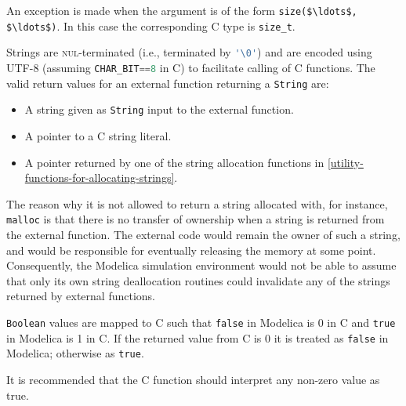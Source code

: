 An exception is made when the argument is of the form {\lstinline!size($\ldots$, $\ldots$)!}.
In this case the corresponding C type is {\lstinline!size_t!}.

Strings are \textsc{nul}-terminated (i.e., terminated by {\lstinline[language=C]!'\0'!}) and are encoded using UTF-8 (assuming {\lstinline[language=C]!CHAR_BIT==8!} in C) to facilitate calling of C functions.
The valid return values for an external function returning a {\lstinline!String!} are:
\begin{itemize}
\item A string given as {\lstinline!String!} input to the external function.
\item A pointer to a C string literal.
\item A pointer returned by one of the string allocation functions in \cref{utility-functions-for-allocating-strings}.
\end{itemize}

\begin{nonnormative}
The reason why it is not allowed to return a string allocated with, for instance, {\lstinline[language=C]!malloc!} is that there is no transfer of ownership when a string is returned from the external function.
The external code would remain the owner of such a string, and would be responsible for eventually releasing the memory at some point.
Consequently, the Modelica simulation environment would not be able to assume that only its own string deallocation routines could invalidate any of the strings returned by external functions.
\end{nonnormative}

{\lstinline!Boolean!} values are mapped to C such that {\lstinline!false!} in Modelica is 0 in C and {\lstinline!true!} in Modelica is 1 in C.
If the returned value from C is 0 it is treated as {\lstinline!false!} in Modelica; otherwise as {\lstinline!true!}.

\begin{nonnormative}
It is recommended that the C function should interpret any non-zero value as true.
\end{nonnormative}

